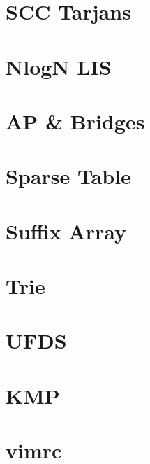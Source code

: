 \documentclass[twocolumn]{article}
\begin{document}
{    \section{SCC Tarjans}
    

    \newpage

    \section{NlogN LIS}
    
    \section{AP \& Bridges}
    
    \section{Sparse Table}
    

    \newpage

    \section{Suffix Array}
    
    \section{Trie}
    
    \section{UFDS}
    

    \newpage

    \section{KMP}
    
    \section{vimrc}
    
}
\end{document}
